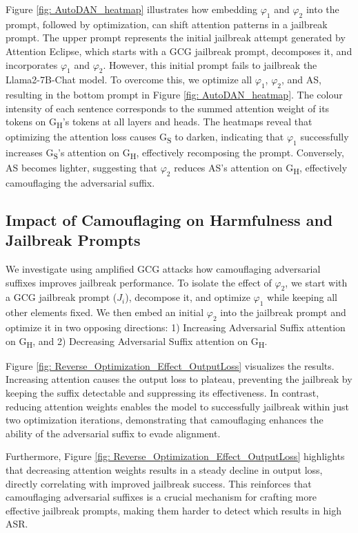Figure \ref{fig: AutoDAN_heatmap} illustrates how embedding $\varphi_1$ and $\varphi_2$ into the prompt, followed by optimization, can shift attention patterns in a jailbreak prompt. The upper prompt represents the initial jailbreak attempt generated by Attention Eclipse, which starts with a GCG jailbreak prompt, decomposes it, and incorporates $\varphi_1$ and $\varphi_2$. However, this initial prompt fails to jailbreak the Llama2-7B-Chat model.
To overcome this, we optimize all $\varphi_1$, $\varphi_2$, and AS, resulting in the bottom prompt in Figure \ref{fig: AutoDAN_heatmap}. The colour intensity of each sentence corresponds to the summed attention weight of its tokens on G\textsubscript{H}'s tokens at all layers and heads. The heatmaps reveal that optimizing the attention loss causes G\textsubscript{S} to darken, indicating that $\varphi_1$ successfully increases G\textsubscript{S}'s attention on G\textsubscript{H}, effectively recomposing the prompt. Conversely, AS becomes lighter, suggesting that $\varphi_2$ reduces AS's attention on G\textsubscript{H}, effectively camouflaging the adversarial suffix.




\subsection{Impact of Camouflaging on Harmfulness and Jailbreak Prompts}

We investigate using amplified GCG attacks how camouflaging adversarial suffixes improves jailbreak performance. To isolate the effect of $\varphi_2$, we start with a GCG jailbreak prompt ($J_i$), decompose it, and optimize $\varphi_1$ while keeping all other elements fixed. We then embed an initial $\varphi_2$ into the jailbreak prompt and optimize it in two opposing directions: 1) Increasing Adversarial Suffix attention on G\textsubscript{H}, and 2) Decreasing Adversarial Suffix attention on G\textsubscript{H}.

Figure \ref{fig: Reverse_Optimization_Effect_OutputLoss} visualizes the results. Increasing attention causes the output loss to plateau, preventing the jailbreak by keeping the suffix detectable and suppressing its effectiveness. In contrast, reducing attention weights enables the model to successfully jailbreak within just two optimization iterations, demonstrating that camouflaging enhances the ability of the adversarial suffix to evade alignment.

Furthermore, Figure \ref{fig: Reverse_Optimization_Effect_OutputLoss} highlights that decreasing attention weights results in a steady decline in output loss, directly correlating with improved jailbreak success. This reinforces that camouflaging adversarial suffixes is a crucial mechanism for crafting more effective jailbreak prompts, making them harder to detect which results in high ASR. 



